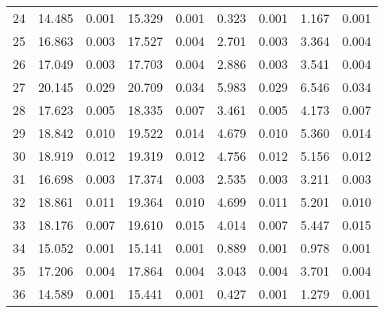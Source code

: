 \documentclass[10pt]{article}
\begin{document}
\begin{longtable}[c]{ccccc|cccc}
24 & \cellcolor{ gray!10 }  14.485 &  0.001 & \cellcolor{ gray!10 }  15.329 &  0.001 & \cellcolor{ gray!10 }  0.323 &  0.001 & \cellcolor{ gray!10 }  1.167 &  0.001 \\
25 & \cellcolor{ gray!10 }  16.863 &  0.003 & \cellcolor{ gray!10 }  17.527 &  0.004 & \cellcolor{ gray!10 }  2.701 &  0.003 & \cellcolor{ gray!10 }  3.364 &  0.004 \\
26 & \cellcolor{ gray!10 }  17.049 &  0.003 & \cellcolor{ gray!10 }  17.703 &  0.004 & \cellcolor{ gray!10 }  2.886 &  0.003 & \cellcolor{ gray!10 }  3.541 &  0.004 \\
27 & \cellcolor{ gray!10 }  20.145 &  0.029 & \cellcolor{ gray!10 }  20.709 &  0.034 & \cellcolor{ gray!10 }  5.983 &  0.029 & \cellcolor{ gray!10 }  6.546 &  0.034 \\
28 & \cellcolor{ gray!10 }  17.623 &  0.005 & \cellcolor{ gray!10 }  18.335 &  0.007 & \cellcolor{ gray!10 }  3.461 &  0.005 & \cellcolor{ gray!10 }  4.173 &  0.007 \\
29 & \cellcolor{ gray!10 }  18.842 &  0.010 & \cellcolor{ gray!10 }  19.522 &  0.014 & \cellcolor{ gray!10 }  4.679 &  0.010 & \cellcolor{ gray!10 }  5.360 &  0.014 \\
30 & \cellcolor{ gray!10 }  18.919 &  0.012 & \cellcolor{ gray!10 }  19.319 &  0.012 & \cellcolor{ gray!10 }  4.756 &  0.012 & \cellcolor{ gray!10 }  5.156 &  0.012 \\
31 & \cellcolor{ gray!10 }  16.698 &  0.003 & \cellcolor{ gray!10 }  17.374 &  0.003 & \cellcolor{ gray!10 }  2.535 &  0.003 & \cellcolor{ gray!10 }  3.211 &  0.003 \\
32 & \cellcolor{ gray!10 }  18.861 &  0.011 & \cellcolor{ gray!10 }  19.364 &  0.010 & \cellcolor{ gray!10 }  4.699 &  0.011 & \cellcolor{ gray!10 }  5.201 &  0.010 \\
33 & \cellcolor{ gray!10 }  18.176 &  0.007 & \cellcolor{ gray!10 }  19.610 &  0.015 & \cellcolor{ gray!10 }  4.014 &  0.007 & \cellcolor{ gray!10 }  5.447 &  0.015 \\
34 & \cellcolor{ gray!10 }  15.052 &  0.001 & \cellcolor{ gray!10 }  15.141 &  0.001 & \cellcolor{ gray!10 }  0.889 &  0.001 & \cellcolor{ gray!10 }  0.978 &  0.001 \\
35 & \cellcolor{ gray!10 }  17.206 &  0.004 & \cellcolor{ gray!10 }  17.864 &  0.004 & \cellcolor{ gray!10 }  3.043 &  0.004 & \cellcolor{ gray!10 }  3.701 &  0.004 \\
36 & \cellcolor{ gray!10 }  14.589 &  0.001 & \cellcolor{ gray!10 }  15.441 &  0.001 & \cellcolor{ gray!10 }  0.427 &  0.001 & \cellcolor{ gray!10 }  1.279 &  0.001 \\

\end{longtable}
\end{document}
